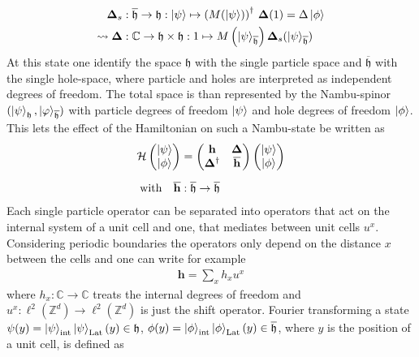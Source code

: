 \begin{align*}
\mathbf{\Delta}_s &: \overline{\mathfrak{h}}\to\mathfrak{h}: \ket{\psi}\mapsto \left(M(\ket{\psi})\right)^\dagger\,\mathbf{\Delta}(1)=\Delta\ket{\phi}\\
\leadsto \mathbf{\Delta} &:\mathbb{C}\to \mathfrak{h}\times\mathfrak{h}: 1\mapsto M\left(\ket{\psi}_{\overline{\mathfrak{h}}}\right)\mathbf{\Delta}_s(\ket{\psi}_{\overline{\mathfrak{h}}})
\end{align*}
At this state one identify the space $\mathfrak{h}$ with the single particle space and $\overline{\mathfrak{h}}$ with the single hole-space, where particle and holes are interpreted as independent degrees of freedom. The total space is than represented by the Nambu-spinor $(\ket{\psi}_{\mathfrak{h}},\ket{\varphi}_{\overline{\mathfrak{h}}})$ with particle degrees of freedom $\ket{\psi}$ and hole degrees of freedom $\ket{\phi}$. This lets the effect of the Hamiltonian on such a Nambu-state be written as
\begin{align*}
    \mathcal{H}\begin{pmatrix}\ket{\psi}\\\ket{\phi} \end{pmatrix}&=\begin{pmatrix} \mathbf{h} & \mathbf{\Delta} \\ \mathbf{\Delta^\dagger} & \overline{\mathbf{h}} \end{pmatrix} \begin{pmatrix}\ket{\psi}\\\ket{\phi} \end{pmatrix}\\[2mm]
    \text{with}\quad \overline{\mathbf{h}}&:\overline{\mathfrak{h}}\to\overline{\mathfrak{h}}
\end{align*}
Each single particle operator can be separated into operators that act on the internal system of a unit cell and one, that mediates between unit cells $u^x$. Considering periodic boundaries the operators only depend on the distance $x$ between the cells and one can write for example
\begin{align*}
    \mathbf{h}=\sum_x h_x u^x
\end{align*}
where $h_x:\mathbb{C}\to\mathbb{C}$ treats the internal degrees of freedom and $u^x:\ell^2(\mathbb{Z}^d)\to\ell^2(\mathbb{Z}^d)$ is just the shift operator.
Fourier transforming a state $\psi(y)=\ket{\psi}_\text{int}\ket{\psi}_\text{Lat}(y)\in\mathfrak{h}$, $\phi(y)=\ket{\phi}_\text{int}\ket{\phi}_\text{Lat}(y)\in\overline{\mathfrak{h}}$, where $y$ is the position of a unit cell, is defined as  
